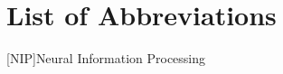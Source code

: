\chapter*{List of Abbreviations} \label{ch:Abbreviations}
\begin{acronym}
    [NIP]{Neural Information Processing}
\end{acronym}